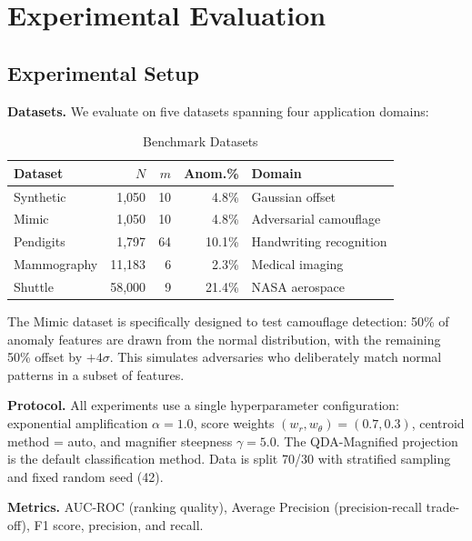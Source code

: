 \documentclass[journal]{IEEEtran}
\begin{document}
\section{Experimental Evaluation}
\label{sec:experiments}

\subsection{Experimental Setup}
\label{ssec:setup}

\textbf{Datasets.} We evaluate on five datasets spanning four application domains:

\begin{table}[h]
\centering
\caption{Benchmark Datasets}
\label{tab:datasets}
\begin{tabular}{@{}lrrrl@{}}
\toprule
\textbf{Dataset} & $N$ & $m$ & \textbf{Anom.\%} & \textbf{Domain} \\
\midrule
Synthetic & 1,050 & 10 & 4.8\% & Gaussian offset \\
Mimic & 1,050 & 10 & 4.8\% & Adversarial camouflage \\
Pendigits & 1,797 & 64 & 10.1\% & Handwriting recognition \\
Mammography & 11,183 & 6 & 2.3\% & Medical imaging \\
Shuttle & 58,000 & 9 & 21.4\% & NASA aerospace \\
\bottomrule
\end{tabular}
\end{table}

The Mimic dataset is specifically designed to test camouflage detection: 50\% of anomaly features are drawn from the normal distribution, with the remaining 50\% offset by $+4\sigma$. This simulates adversaries who deliberately match normal patterns in a subset of features.

\textbf{Protocol.} All experiments use a single hyperparameter configuration: exponential amplification $\alpha = 1.0$, score weights $(w_r, w_\theta) = (0.7, 0.3)$, centroid method = auto, and magnifier steepness $\gamma = 5.0$. The QDA-Magnified projection is the default classification method. Data is split 70/30 with stratified sampling and fixed random seed (42).

\textbf{Metrics.} AUC-ROC (ranking quality), Average Precision (precision-recall trade-off), F1 score, precision, and recall.
\end{document}
